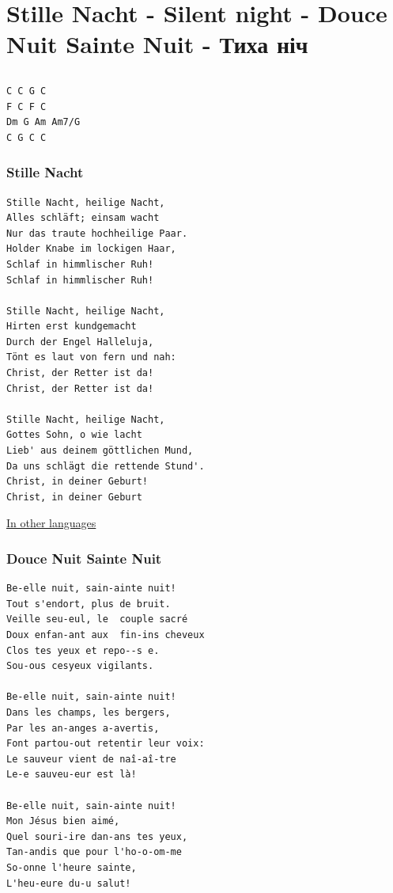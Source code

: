 \documentclass[
]{article}
\begin{document}
\hypertarget{stille-nacht---silent-night---douce-nuit-sainte-nuit---ux442ux438ux445ux430-ux43dux456ux447}{%
\section{Stille Nacht - Silent night - Douce Nuit Sainte Nuit - Тиха
ніч}\label{stille-nacht---silent-night---douce-nuit-sainte-nuit---ux442ux438ux445ux430-ux43dux456ux447}}

\hypertarget{section-1}{%
\subsection*{}\label{section-1}}

\begin{verbatim}
C C G C
F C F C
Dm G Am Am7/G
C G C C
\end{verbatim}

\hypertarget{stille-nacht}{%
\subsubsection*{Stille Nacht}\label{stille-nacht}}

\begin{verbatim}
Stille Nacht, heilige Nacht,
Alles schläft; einsam wacht
Nur das traute hochheilige Paar.
Holder Knabe im lockigen Haar,
Schlaf in himmlischer Ruh!
Schlaf in himmlischer Ruh!

Stille Nacht, heilige Nacht,
Hirten erst kundgemacht
Durch der Engel Halleluja,
Tönt es laut von fern und nah:
Christ, der Retter ist da!
Christ, der Retter ist da!

Stille Nacht, heilige Nacht,
Gottes Sohn, o wie lacht
Lieb' aus deinem göttlichen Mund,
Da uns schlägt die rettende Stund'.
Christ, in deiner Geburt!
Christ, in deiner Geburt
\end{verbatim}

\href{https://omniglot.com/songs/multilingual/silentnight/index.php}{In
other languages}

\hypertarget{douce-nuit-sainte-nuit}{%
\subsubsection*{Douce Nuit Sainte Nuit}\label{douce-nuit-sainte-nuit}}

\begin{verbatim}
Be-elle nuit, sain-ainte nuit!
Tout s'endort, plus de bruit.
Veille seu-eul, le  couple sacré
Doux enfan-ant aux  fin-ins cheveux
Clos tes yeux et repo--s e.
Sou-ous cesyeux vigilants.

Be-elle nuit, sain-ainte nuit! 
Dans les champs, les bergers, 
Par les an-anges a-avertis, 
Font partou-out retentir leur voix: 
Le sauveur vient de naî-aî-tre 
Le-e sauveu-eur est là! 

Be-elle nuit, sain-ainte nuit! 
Mon Jésus bien aimé, 
Quel souri-ire dan-ans tes yeux, 
Tan-andis que pour l'ho-o-om-me 
So-onne l'heure sainte, 
L'heu-eure du-u salut! 
\end{verbatim}
\end{document}

